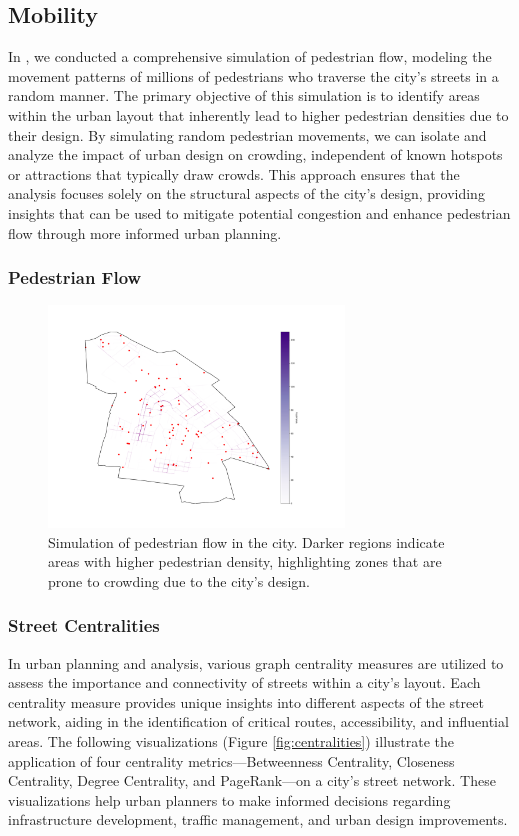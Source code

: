 \subsection{Mobility}
In \label{fig
}, we conducted a comprehensive simulation of pedestrian flow, modeling the movement patterns of millions of pedestrians who traverse the city's streets in a random manner. The primary objective of this simulation is to identify areas within the urban layout that inherently lead to higher pedestrian densities due to their design. By simulating random pedestrian movements, we can isolate and analyze the impact of urban design on crowding, independent of known hotspots or attractions that typically draw crowds. This approach ensures that the analysis focuses solely on the structural aspects of the city's design, providing insights that can be used to mitigate potential congestion and enhance pedestrian flow through more informed urban planning.
\subsubsection{Pedestrian Flow}
\begin{figure}
    \centering
    \includegraphics[width=0.7\textwidth]{figures/Adri/random_walk.png}
    \caption{Simulation of pedestrian flow in the city. Darker regions indicate areas with higher pedestrian density, highlighting zones that are prone to crowding due to the city's design.}
    \label{fig:simulation_flow}
\end{figure}
\subsubsection{Street Centralities}

In urban planning and analysis, various graph centrality measures are utilized to assess the importance and connectivity of streets within a city's layout. Each centrality measure provides unique insights into different aspects of the street network, aiding in the identification of critical routes, accessibility, and influential areas. The following visualizations (Figure \ref{fig:centralities}) illustrate the application of four centrality metrics—Betweenness Centrality, Closeness Centrality, Degree Centrality, and PageRank—on a city's street network. These visualizations help urban planners to make informed decisions regarding infrastructure development, traffic management, and urban design improvements.

